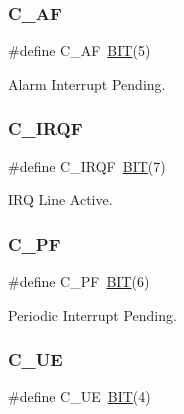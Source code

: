 \hypertarget{group___serial_gada554ae87b096739211adfc2f59d44f9}{}\label{group___serial_gada554ae87b096739211adfc2f59d44f9} 
\subsubsection{\texorpdfstring{C\+\_\+\+AF}{C\_AF}}
{\footnotesize\ttfamily \#define C\+\_\+\+AF~\hyperlink{group___serial_ga3a8ea58898cb58fc96013383d39f482c}{B\+IT}(5)}



Alarm Interrupt Pending. 

\hypertarget{group___serial_ga100fdbb4db6d90f4b479dc9a2228d90d}{}\label{group___serial_ga100fdbb4db6d90f4b479dc9a2228d90d} 
\subsubsection{\texorpdfstring{C\+\_\+\+I\+R\+QF}{C\_IRQF}}
{\footnotesize\ttfamily \#define C\+\_\+\+I\+R\+QF~\hyperlink{group___serial_ga3a8ea58898cb58fc96013383d39f482c}{B\+IT}(7)}



I\+RQ Line Active. 

\hypertarget{group___serial_ga05e94124733b6b9a37d3c709e9a99876}{}\label{group___serial_ga05e94124733b6b9a37d3c709e9a99876} 
\subsubsection{\texorpdfstring{C\+\_\+\+PF}{C\_PF}}
{\footnotesize\ttfamily \#define C\+\_\+\+PF~\hyperlink{group___serial_ga3a8ea58898cb58fc96013383d39f482c}{B\+IT}(6)}



Periodic Interrupt Pending. 

\hypertarget{group___serial_gace5b43f703177f892af015bb446486c6}{}\label{group___serial_gace5b43f703177f892af015bb446486c6} 
\subsubsection{\texorpdfstring{C\+\_\+\+UE}{C\_UE}}
{\footnotesize\ttfamily \#define C\+\_\+\+UE~\hyperlink{group___serial_ga3a8ea58898cb58fc96013383d39f482c}{B\+IT}(4)}



